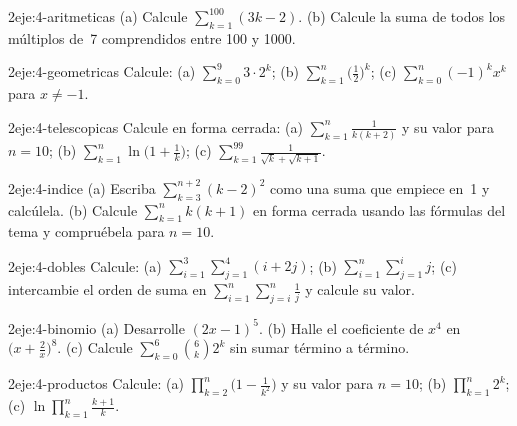 \begin{ejercicio}{2}{eje:4-aritmeticas}
(a) Calcule $\sum_{k=1}^{100}(3k-2)$. (b) Calcule la suma de todos los múltiplos de~7 comprendidos entre 100 y 1000.
\end{ejercicio}

\begin{ejercicio}{2}{eje:4-geometricas}
Calcule: (a) $\sum_{k=0}^{9}3\cdot2^k$; (b) $\sum_{k=1}^{n}\bigl(\frac12\bigr)^k$; (c) $\sum_{k=0}^{n}(-1)^kx^k$ para $x\neq-1$.
\end{ejercicio}

\begin{ejercicio}{2}{eje:4-telescopicas}
Calcule en forma cerrada: (a) $\sum_{k=1}^n\frac1{k(k+2)}$ y su valor para $n=10$; (b) $\sum_{k=1}^n\ln\bigl(1+\frac1k\bigr)$; (c) $\sum_{k=1}^{99}\frac1{\sqrt k+\sqrt{k+1}}$.
\end{ejercicio}

\begin{ejercicio}{2}{eje:4-indice}
(a) Escriba $\sum_{k=3}^{n+2}(k-2)^2$ como una suma que empiece en~1 y calcúlela. (b) Calcule $\sum_{k=1}^nk(k+1)$ en forma cerrada usando las fórmulas del tema y compruébela para $n=10$.
\end{ejercicio}

\begin{ejercicio}{2}{eje:4-dobles}
Calcule: (a) $\sum_{i=1}^3\sum_{j=1}^4(i+2j)$; (b) $\sum_{i=1}^n\sum_{j=1}^ij$; (c) intercambie el orden de suma en $\sum_{i=1}^n\sum_{j=i}^n\frac1j$ y calcule su valor.
\end{ejercicio}

\begin{ejercicio}{2}{eje:4-binomio}
(a) Desarrolle $(2x-1)^5$. (b) Halle el coeficiente de $x^4$ en $\bigl(x+\frac2x\bigr)^8$. (c) Calcule $\sum_{k=0}^{6}\binom6k2^k$ sin sumar término a término.
\end{ejercicio}

\begin{ejercicio}{2}{eje:4-productos}
Calcule: (a) $\prod_{k=2}^n\bigl(1-\frac1{k^2}\bigr)$ y su valor para $n=10$; (b) $\prod_{k=1}^n2^k$; (c) $\ln\prod_{k=1}^{n}\frac{k+1}{k}$.
\end{ejercicio}

